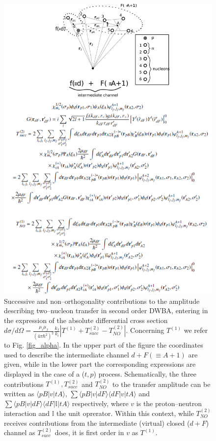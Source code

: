 \documentclass[a4paper,11pt]{book}
\numberwithin{equation}{section}
\numberwithin{figure}{section}
\numberwithin{table}{section}
\begin{document}
\begin{figure}
\centerline{\includegraphics*[width=\textwidth,angle=0]{figs/fig_beta.pdf}}
\caption{Successive and non--orthogonality contributions to the  amplitude describing two--nucleon transfer in second order DWBA, entering in the expression of the absolute differential cross section $d\sigma/d\Omega=\tfrac{\mu_i\mu_f}{(4\pi\hbar^2)^2}\tfrac{k_f}{k_i}\left|T^{(1)}+T_{succ}^{(2)}-T^{(2)}_{NO}\right|$. Concerning $T^{(1)}$ we refer to Fig. \ref{fig_alpha}. In the upper part of the figure the coordinates used to describe the intermediate channel $d+F(\equiv A+1)$ are given, while in the lower part the corresponding expressions are displayed \citep{Potel:13b} in the case of a ($t,p$) process. Schematically, the three contributions $T^{(1)}, T^{(2)}_{succ}$ and $T^{(2)}_{NO}$ to the transfer amplitude can be written as $\langle pB|v|tA\rangle$, $\sum \langle pB|v|dF\rangle\langle dF|v|tA\rangle$ and $\sum \langle pB|v|dF\rangle\langle dF|\mathbb I|tA\rangle$ respectively, where $v$ is the proton--neutron interaction and $\mathbb I$ the unit oprerator. Within this context, while $T^{(2)}_{NO}$ receives contributions from the intermediate (virtual) closed ($d+F$) channel as $T^{(2)}_{succ}$ does, it is first order in $v$ as $T^{(1)}$.}\label{fig_beta}
\end{figure}
\end{document}
